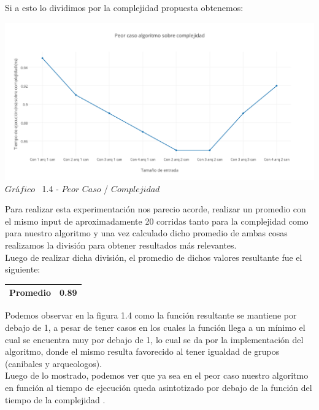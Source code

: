 Si a esto lo dividimos por la complejidad propuesta obtenemos:\\

\vspace*{0.3cm} \vspace*{0.3cm}
  \begin{center}
 \includegraphics[scale=0.6]{./EJ1/peorcasoej11.png}
 {$Gr$\'a$fico$ \ 1.4 - $Peor$ $Caso$ / $Complejidad$}
  \end{center}
   \vspace*{0.3cm}
  
  Para realizar esta experimentaci\'on nos parecio acorde, realizar un promedio con el mismo input de aproximadamente 20 corridas tanto para la complejidad como para nuestro algoritmo y una vez calculado dicho promedio de ambas cosas realizamos la divisi\'on para obtener resultados m\'as relevantes.\\ 

Luego de realizar dicha divisi\'on, el promedio de dichos valores resultante fue el siguiente:

\begin{center}
\begin{table}[H]
    \begin{tabular}{ | l |l |}
    \hline
	
    \textbf{Promedio} &  0.89 \\ \hline

    \end{tabular}
\end{table}
\end{center}

Podemos observar en la figura 1.4 como la funci\'on resultante se mantiene por debajo de 1, a pesar de tener casos en los cuales la funci\'on llega a un m\'inimo el cual se encuentra muy por debajo de 1, lo cual se da por la implementaci\'on del algoritmo, donde el mismo resulta favorecido al tener igualdad de grupos (canibales y arqueologos).\\

Luego de lo mostrado, podemos ver que ya sea en el peor caso nuestro algoritmo en funci\'on al tiempo de ejecuci\'on queda asintotizado por debajo de la funci\'on del tiempo de la complejidad .